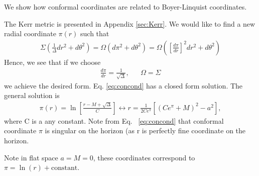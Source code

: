 \documentclass[aps,prd,amsmath,showpacs,amssymb,superscriptaddress,nofootinbib,longbibliography,eqsecnum,preprintnumbers]{revtex4-1}
\begin{document}
We show how conformal coordinates are related to Boyer-Linquist coordinates.


The Kerr metric is presented in Appendix \ref{sec:Kerr}. We would like to find a new radial coordinate $\pi(r)$ such that
\begin{align}
\Sigma \left(\frac{1}{\Delta}dr^2+d\theta^2 \right)=\Omega\left(d\pi^2+d\theta^2\right) =\Omega\left(\left[\frac{d\pi}{dr}\right]^2dr^2+d\theta^2\right) 
\end{align}
Hence, we see that if we choose
\begin{align}
&\frac{d\pi}{dr}=\frac{1}{\sqrt{\Delta}},& &\Omega= \Sigma& \label{eq:concond}
\end{align}
we achieve the desired form. Eq. \eqref{eq:concond} has a closed form solution.
The general solution is 
\begin{align}
\pi(r)=\ln\left[\frac{r-M+\sqrt{\Delta}}{C}\right]\longleftrightarrow r=\frac{1}{2Ce^\pi}\left[(Ce^\pi+M)^2-a^2\right],
\end{align}
where C is a any constant. Note from Eq. ~\eqref{eq:concond} that conformal coordinate $\pi$ is singular on the horizon (as r is perfectly fine coordinate on the horizon.

Note in flat space $a= M =0$, these coordinates correspond to $\pi = \ln(r) +\text{constant}$.

\end{document}
